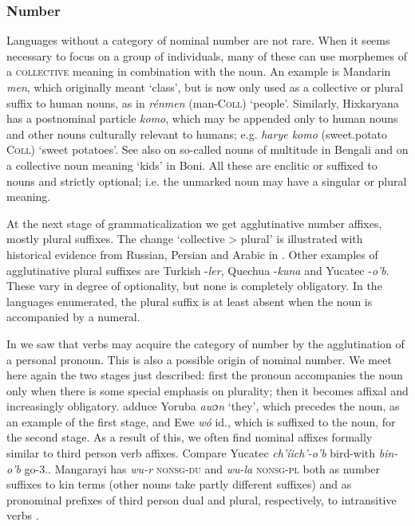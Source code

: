 \subsubsection{Number} \label{sec:3.3.1.1}
Languages without a category of nominal number are not rare. When it seems necessary to focus on a group of individuals, many of these can use morphemes of a \textsc{collective} meaning in combination with the noun. An example is Mandarin \textit{men}, which originally meant ‘class’, but is now only used as a collective or plural suffix to human nouns, as in \textit{rénmen} (man-\textsc{Coll}) ‘people’. Similarly, Hixkaryana has a postnominal particle \textit{komo}, which may be appended only to human nouns and other nouns culturally relevant to humans; e.g. \textit{harye komo} (sweet.potato \textsc{Coll}) ‘sweet potatoes’. See also \citet[§2.1]{Kölver1982a} on so-called nouns of multitude in Bengali and \citet[272]{HeineEtAl1984} on a collective noun meaning ‘kids’ in Boni. All these are enclitic or suffixed to nouns and strictly optional; i.e. the unmarked noun may have a singular or plural meaning.

At the next stage of grammaticalization we get agglutinative number affixes, mostly plural suffixes. The change ‘collective {\textgreater} plural’ is illustrated with historical evidence from Russian, Persian and Arabic in \citet[52]{Kuryłowicz1965}. Other examples of agglutinative plural suffixes are Turkish -\textit{ler}, Quechua -\textit{kuna} and Yucatec -\textit{o'b}. These vary in degree of optionality, but none is completely obligatory. In the languages enumerated, the plural suffix is at least absent when the noun is accompanied by a numeral.

In  we saw that verbs may acquire the category of number by the agglutination of a personal pronoun. This is also a possible origin of nominal number. We meet here again the two stages just described: first the pronoun accompanies the noun only when there is some special emphasis on plurality; then it becomes affixal and increasingly obligatory. \citet[234]{HeineEtAl1984} adduce Yoruba \textit{awɔn} ‘they’, which precedes the noun, as an example of the first stage, and Ewe \textit{wó} id., which is suffixed to the noun, for the second stage. As a result of this, we often find nominal affixes formally similar to third person verb affixes. Compare Yucatec \textit{ch'íich'-o'b} bird-\glpl with \textit{bin-o'b} go-3.\glpl. Mangarayi has \textit{wu-r} \textsc{nonsg-du} and \textit{wu-la} \textsc{nonsg-pl} both as number suffixes to kin terms (other nouns take partly different suffixes) and as pronominal prefixes of third person dual and plural, respectively, to intransitive verbs \citep[88f, 160f]{Merlan1982}.

